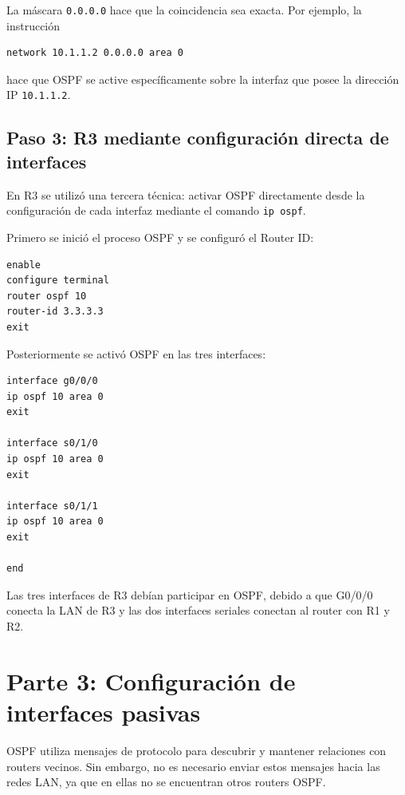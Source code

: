 \documentclass[12pt,a4paper]{article}
\begin{document}
La máscara \texttt{0.0.0.0} hace que la coincidencia sea exacta.
Por ejemplo, la instrucción

\begin{lstlisting}[style=cisco]
network 10.1.1.2 0.0.0.0 area 0
\end{lstlisting}

hace que OSPF se active específicamente sobre la interfaz que posee la
dirección IP \texttt{10.1.1.2}.

\subsection{Paso 3: R3 mediante configuración directa de interfaces}

En R3 se utilizó una tercera técnica: activar OSPF directamente desde
la configuración de cada interfaz mediante el comando
\texttt{ip ospf}.

Primero se inició el proceso OSPF y se configuró el Router ID:

\begin{lstlisting}[style=cisco]
enable
configure terminal
router ospf 10
router-id 3.3.3.3
exit
\end{lstlisting}

Posteriormente se activó OSPF en las tres interfaces:

\begin{lstlisting}[style=cisco]
interface g0/0/0
ip ospf 10 area 0
exit

interface s0/1/0
ip ospf 10 area 0
exit

interface s0/1/1
ip ospf 10 area 0
exit

end
\end{lstlisting}

Las tres interfaces de R3 debían participar en OSPF, debido a que
G0/0/0 conecta la LAN de R3 y las dos interfaces seriales conectan al
router con R1 y R2.

\section{Parte 3: Configuración de interfaces pasivas}

OSPF utiliza mensajes de protocolo para descubrir y mantener
relaciones con routers vecinos. Sin embargo, no es necesario enviar
estos mensajes hacia las redes LAN, ya que en ellas no se encuentran
otros routers OSPF.
\end{document}
